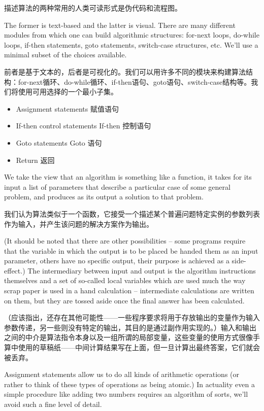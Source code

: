 描述算法的两种常用的人类可读形式是伪代码和流程图。

The former is text-based
and the latter is visual.  There are many different modules from which
one can build algorithmic structures: for-next loops, do-while loops, if-then
statements, goto statements, switch-case structures, etc.   We'll use
a minimal subset of the choices available.

前者是基于文本的，后者是可视化的。我们可以用许多不同的模块来构建算法结构：for-next循环、do-while循环、if-then语句、goto语句、switch-case结构等。我们将使用可用选择的一个最小子集。

\begin{itemize}
\item Assignment statements 赋值语句
\item If-then control statements If-then 控制语句
\item Goto statements Goto 语句
\item Return 返回
\end{itemize}

We take the view that an algorithm is something like a function, it
takes for its input a list of parameters that describe a particular
case of some general problem, and produces as its output a solution to
that problem.

我们认为算法类似于一个函数，它接受一个描述某个普遍问题特定实例的参数列表作为输入，并产生该问题的解决方案作为输出。

(It should be noted that there are other possibilities
-- some programs require that the variable in which the output is to
be placed be handed them as an input parameter, others have no
specific output, their purpose is achieved as a side-effect.)  The
intermediary between input and output is the algorithm instructions
themselves and a set of so-called local variables which are used much
the way scrap paper is used in a hand calculation -- intermediate
calculations are written on them, but they are tossed aside once the
final answer has been calculated.

（应该指出，还存在其他可能性——一些程序要求将用于存放输出的变量作为输入参数传递，另一些则没有特定的输出，其目的是通过副作用实现的。）输入和输出之间的中介是算法指令本身以及一组所谓的局部变量，这些变量的使用方式很像手算中使用的草稿纸——中间计算结果写在上面，但一旦计算出最终答案，它们就会被丢弃。

Assignment statements allow us to do all kinds of arithmetic
operations (or rather to think of these types of operations as being
atomic.)  In actuality even a simple procedure like adding two numbers
requires an algorithm of sorts, we'll avoid such a fine level of
detail.

